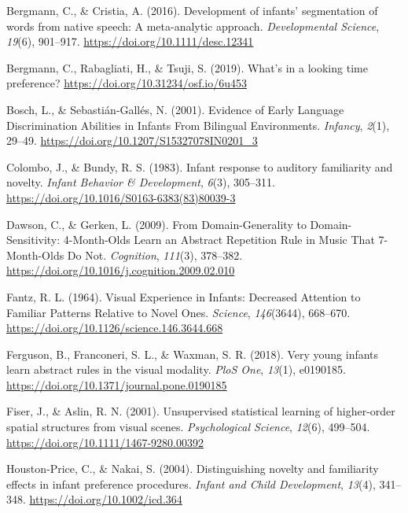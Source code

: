 \documentclass[english,man,man,floatsintext]{apa6}
\begin{document}
\leavevmode\hypertarget{ref-bergmann2016}{}%
Bergmann, C., \& Cristia, A. (2016). Development of infants' segmentation of words from native speech: A meta-analytic approach. \emph{Developmental Science}, \emph{19}(6), 901--917. \url{https://doi.org/10.1111/desc.12341}

\leavevmode\hypertarget{ref-bergmann2019}{}%
Bergmann, C., Rabagliati, H., \& Tsuji, S. (2019). What's in a looking time preference? \url{https://doi.org/10.31234/osf.io/6u453}

\leavevmode\hypertarget{ref-bosch2001}{}%
Bosch, L., \& Sebastián‐Gallés, N. (2001). Evidence of Early Language Discrimination Abilities in Infants From Bilingual Environments. \emph{Infancy}, \emph{2}(1), 29--49. \url{https://doi.org/10.1207/S15327078IN0201_3}

\leavevmode\hypertarget{ref-colombo1983}{}%
Colombo, J., \& Bundy, R. S. (1983). Infant response to auditory familiarity and novelty. \emph{Infant Behavior \& Development}, \emph{6}(3), 305--311. \url{https://doi.org/10.1016/S0163-6383(83)80039-3}

\leavevmode\hypertarget{ref-dawson2009}{}%
Dawson, C., \& Gerken, L. (2009). From Domain-Generality to Domain-Sensitivity: 4-Month-Olds Learn an Abstract Repetition Rule in Music That 7-Month-Olds Do Not. \emph{Cognition}, \emph{111}(3), 378--382. \url{https://doi.org/10.1016/j.cognition.2009.02.010}

\leavevmode\hypertarget{ref-fantz1964}{}%
Fantz, R. L. (1964). Visual Experience in Infants: Decreased Attention to Familiar Patterns Relative to Novel Ones. \emph{Science}, \emph{146}(3644), 668--670. \url{https://doi.org/10.1126/science.146.3644.668}

\leavevmode\hypertarget{ref-ferguson2018}{}%
Ferguson, B., Franconeri, S. L., \& Waxman, S. R. (2018). Very young infants learn abstract rules in the visual modality. \emph{PloS One}, \emph{13}(1), e0190185. \url{https://doi.org/10.1371/journal.pone.0190185}

\leavevmode\hypertarget{ref-fiser2001}{}%
Fiser, J., \& Aslin, R. N. (2001). Unsupervised statistical learning of higher-order spatial structures from visual scenes. \emph{Psychological Science}, \emph{12}(6), 499--504. \url{https://doi.org/10.1111/1467-9280.00392}

\leavevmode\hypertarget{ref-houston-price2004}{}%
Houston‐Price, C., \& Nakai, S. (2004). Distinguishing novelty and familiarity effects in infant preference procedures. \emph{Infant and Child Development}, \emph{13}(4), 341--348. \url{https://doi.org/10.1002/icd.364}
\end{document}
